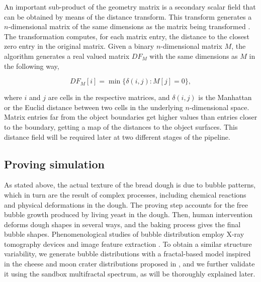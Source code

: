 An important sub-product of the geometry matrix is a secondary scalar field that can be obtained by means of the distance transform.
This transform generates a $n$-dimensional matrix of the same dimensions as the matrix being transformed \cite{osh03}. 
The transformation computes, for each matrix entry, the distance to the closest zero entry in the original matrix.
Given a binary $n$-dimensional matrix $M$, the algorithm generates a real valued matrix $DF_{M}$ with the same dimensions as $M$ in the following way,

$$  DF_{M}[i] = \min \bigg\{ \delta(i,j): M[j] = 0 \bigg\},$$



\noindent
where $i$ and $j$ are cells in the respective matrices, and $\delta(i,j)$ is the Manhattan or the Euclid distance between two cells in the underlying $n$-dimensional space. 
Matrix entries far from the object boundaries get higher values than entries closer to the boundary, getting a map of the distances to the object surfaces. 
This distance field will be required later at two different stages of the pipeline.

\subsection{Proving simulation}
\label{breadprov}

As stated above, the actual texture of the bread dough is due to bubble patterns, which in turn are the result of complex processes, including chemical reactions and physical deformations in the dough.
The proving step accounts for the free bubble growth produced by living yeast in the dough.
Then, human intervention deforms dough shapes in several ways, and the baking process gives the final bubble shapes.
Phenomenological studies of bubble distribution employ X-ray tomography devices and image feature extraction \cite{Babin2006,Gonzales2008,VanDyck2014}.
To obtain a similar structure variability, we generate bubble distributions with a fractal-based model inspired in the cheese and moon crater distributions proposed in \cite{Mandelbrot1982}, and we further validate it using the sandbox multifractal spectrum, as will be thoroughly explained later.

